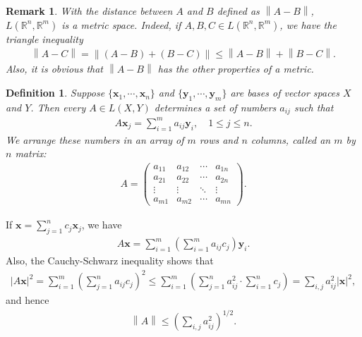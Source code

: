 \documentclass[10pt]{book}
\newtheorem{definition}{Definition}[chapter]
\newtheorem{remark}{Remark}[chapter]
\theoremstyle{definition}
\numberwithin{equation}{chapter}
\begin{document}
\begin{remark}
With the distance between $A$ and $B$ defined as $\left\|A - B\right\|$, $L(\mathbb{R}^n,\mathbb{R}^m)$ is a metric space. Indeed, if $A, B, C \in L(\mathbb{R}^n,\mathbb{R}^m)$, we have the triangle inequality
\begin{align*}
    \left\|A - C\right\| = \left\|(A - B) + (B - C)\right\| \leq \left\|A - B\right\| + \left\|B - C\right\|.
\end{align*}
Also, it is obvious that $\left\|A - B\right\|$ has the other properties of a metric.
\end{remark}

\medskip

\begin{definition}
Suppose $\{\mathbf{x}_1, \cdots, \mathbf{x}_n\}$ and $\{\mathbf{y}_1, \cdots, \mathbf{y}_m\}$ are bases of vector spaces $X$ and $Y$. Then every $A \in L(X,Y)$ determines a set of numbers $a_{ij}$ such that
\begin{align*}
    A\mathbf{x}_j = \sum^m_{i=1} a_{ij} \mathbf{y}_i, \quad 1 \leq j \leq n.
\end{align*}
We arrange these numbers in an array of $m$ rows and $n$ columns, called an $m$ by $n$ matrix:
\begin{align*}
    A = \begin{pmatrix}
        a_{11} & a_{12} & \cdots & a_{1n} \\
        a_{21} & a_{22} & \cdots & a_{2n} \\
        \vdots & \vdots & \ddots & \vdots \\
        a_{m1} & a_{m2} & \cdots & a_{mn}
    \end{pmatrix}.
\end{align*}
\end{definition}

\medskip

If $\mathbf{x} = \sum^n_{j=1} c_j \mathbf{x}_j$, we have
\begin{align*}
    A\mathbf{x} = \sum^m_{i=1} \left(\sum^m_{i=1} a_{ij} c_j\right) \mathbf{y}_i.
\end{align*}
Also, the Cauchy-Schwarz inequality shows that
\begin{align*}
    \left|A\mathbf{x}\right|^2 = \sum^m_{i=1} \left(\sum^n_{j=1} a_{ij} c_j\right)^2 \leq \sum^m_{i=1} \left(\sum^n_{j=1} a_{ij}^2 \cdot \sum^n_{i=1} c_j\right) = \sum_{i,j} a_{ij}^2 \left|\mathbf{x}\right|^2,
\end{align*}
and hence
\begin{align*}
    \left\|A\right\| \leq \left(\sum_{i,j} a_{ij}^2\right)^{1/2}.
\end{align*}
\end{document}
